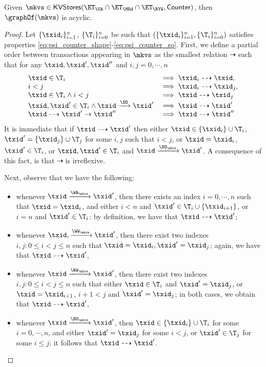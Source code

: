 \begin{corollary}
\label{cor:psi_counter_acyclic}
Given $\mkvs \in \mathsf{KVStores}(\ET_{\UA} \cap \ET_{\MRd} \cap \ET_{\RYW}, \mathsf{Counter})$, 
then $\graphOf(\mkvs)$ is acyclic.
\end{corollary}

\begin{proof}
Let $\{\txid_{i}\}_{i=1}^{n}$, $\{\T_{i}\}_{i=0}^{n}$ 
be such that $(\{\txid_{i}\}_{i=1}^{n}, \{\T_{i}\}_{i=0}^{n})$ 
satisfies properties \eqref{eq:psi_counter_shape}-\eqref{eq:psi_counter_so}. 
First, we define a partial order between transactions appearing in $\mkvs$ 
as the smallest relation $\dashrightarrow$ such that for any $\txid, \txid', \txid''$ and 
$i,j = 0,\cdots, n$
\[
\begin{array}{ll}
\txid \in \T_{i} &\implies \txid_{i} \dashrightarrow \txid,\\
i < j &\implies \txid_{i} \dashrightarrow \txid_{j},\\
\txid \in \T_{i} \wedge i < j & \implies \txid \dashrightarrow \txid_{j}\\
\txid, \txid' \in \T_{i} \wedge \txid \xrightarrow{\SO} \txid' &\implies \txid \dashrightarrow \txid'\\
\txid \dashrightarrow \txid' \rightarrow \txid'' &\implies \txid \dashrightarrow \txid''
\end{array}
\]
It is immediate that if $\txid \dashrightarrow \txid'$ then either $\txid \in \{\txid_{i}\} \cup \T_i$, 
$\txid' = \{\txid_{j}\} \cup \T_{j}$ for some $i,j$ such that $i < j$, or $\txid = \txid_{i}$, $\txid' \in \T_i$, 
or $\txid, \txid' \in \T_{i}$ and $\txid \xrightarrow{\SO_{\mkvs}} \txid'$. A consequence of this fact, 
is that $\dashrightarrow$ is irreflexive.

Next, observe that we have the following: 
\begin{itemize}
\item whenever $\txid \xrightarrow{\WR_{\mkvs}} \txid'$, then 
there exists an index $i = 0,\cdots, n$ such that $\txid = \txid_{i}$, 
and either $i < n$ and $\txid' \in \T_{i} \cup \{ \txid_{i+1} \}$, 
or $i = n$ and $\txid' \in \T_{i}$: by definition, we have that $\txid \dashrightarrow \txid'$;
\item whenever $\txid, \xrightarrow{\WW_{\mkvs}} \txid'$, 
then there exist two indexes $i, j: 0 \leq i < j \leq n$ such that 
$\txid = \txid_{i}, \txid' = \txid_{j}$; again, we have that $\txid \dashrightarrow \txid'$, 
\item whenever $\txid \xrightarrow{\RW_{\mkvs}} \txid'$, then 
there exist two indexes $i, j: 0 \leq i < j \leq n$ such that either 
$\txid \in \T_{i}$ and $\txid' = \txid_{j}$, or $\txid = \txid_{i+1}$, 
$i+1 < j$ and $\txid' = \txid_{j}$; in both cases, we obtain that $\txid \dashrightarrow \txid'$,
\item whenever $\txid \xrightarrow{\SO_{\mkvs}} \txid'$, then 
$\txid \in \{\txid_{i}\} \cup \T_{i}$ for some $i=0,\cdots,n$, 
and either $\txid' = \txid_{j}$ for some $i < j$,  or $\txid' \in \T_{j}$ for 
some $i \leq j$; it follows that $\txid \dashrightarrow \txid'$.
\end{itemize}


\end{proof}
